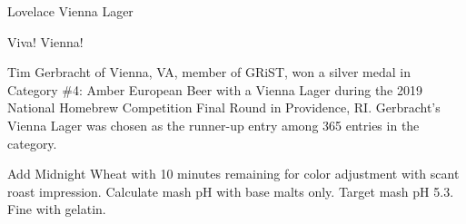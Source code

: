 \begin{recipe}{Lovelace Vienna Lager}
\begin{ingredientsblock}

\end{ingredientsblock}

\begin{recipe}{Viva! Vienna!}

\begin{aboutblock}
Tim Gerbracht of Vienna, VA, member of GRiST, won a silver medal in Category
\#4: Amber European Beer with a Vienna Lager during the 2019 National Homebrew
Competition Final Round in Providence, RI. Gerbracht's Vienna Lager was chosen
as the runner-up entry among 365 entries in the category. \sourceaha
\end{aboutblock}


\begin{methodandtiming}
 
\begin{mashsteps}
\end{mashsteps}

\begin{fermentationsteps}
\end{fermentationsteps}

\begin{directions}
Add Midnight Wheat with 10 minutes remaining for color adjustment with scant
roast impression. Calculate mash pH with base malts only. Target mash pH 5.3.
Fine with gelatin.
\end{directions}

\end{methodandtiming}

\recipebreak

\begin{ingredientsblock}

\begin{malts}
\end{malts}

\begin{hops}
\end{hops}


\end{ingredientsblock}

\end{recipe}

\end{recipe}
